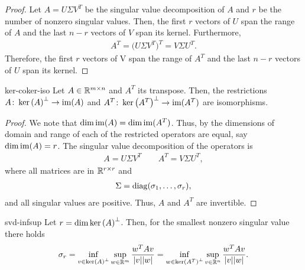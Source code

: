 \begin{proof}
  Let $A=U\Sigma V^T$ be the singular value decomposition of $A$ and
  $r$ be the number of nonzero singular values. Then, the first $r$
  vectors of $U$ span the range of $A$ and the last $n-r$ vectors of
  $V$ span its kernel. Furthermore,
  \begin{gather}
    A^T = \bigl(U\Sigma V^T\bigr)^T = V \Sigma U^T.
  \end{gather}
  Therefore, the first $r$ vectors of V span the range of $A^T$ and
  the last $n-r$ vectors of $U$ span its kernel.
\end{proof}

\begin{Corollary}{ker-coker-iso}
  Let $A\in \mathbb R^{m\times n}$ and $A^T$ its transpose. Then, the
  restrictions $A\colon \operatorname{ker}\left(A\right)^\perp \to \operatorname{im}(A)$ and $A^T\colon
  \operatorname{ker}\left(A^T\right)^\perp \to \operatorname{im}(A^T)$ are isomorphisms.
\end{Corollary}

\begin{proof}
  We note that $\dim \operatorname{im}(A) = \dim \operatorname{im}(A^T)$. Thus, by
   the dimensions of domain and range of
  each of the restricted operators are equal, say $\dim \operatorname{im}(A) =
  r$. The singular value decomposition of the operators is
  \begin{gather*}
    A = U\Sigma V^T \qquad A^T = V\Sigma U^T,
  \end{gather*}
  where all matrices are in $\mathbb R^{r\times r}$ and
  \begin{gather*}
    \Sigma = \operatorname{diag}(\sigma_1,\dots,\sigma_r),
  \end{gather*}
  and all singular values are positive. Thus, $A$ and $A^T$ are invertible.
\end{proof}

\begin{Corollary}{svd-infsup}
  Let $r=\dim \operatorname{ker}\left(A\right)^\perp$. Then, for the smallest nonzero singular
  value there holds
  \begin{gather}
    \label{eq:infsup:6}
    \sigma_r
    = \inf_{v\in \operatorname{ker}\left(A\right)^\perp} \sup_{w\in \mathbb R^m} \frac{w^T A v}{\lvert v\rvert\lvert w\rvert}
    = \inf_{w\in \operatorname{ker}\left(A^T\right)^\perp} \sup_{v\in \mathbb R^n} \frac{w^T A v}{\lvert v\rvert\lvert w\rvert}.
  \end{gather}
\end{Corollary}

